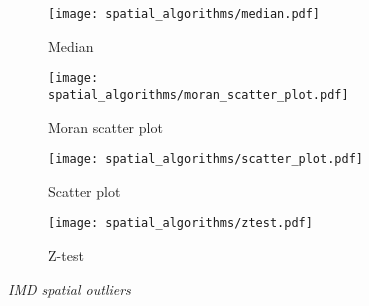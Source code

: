 \begin{figure}
\centering
	\begin{subfigure}[b]{0.45	\linewidth}
		\texttt{[image: spatial\_algorithms/median.pdf]}
		\caption{Median}
	\end{subfigure}	
	\begin{subfigure}[b]{0.45	\linewidth}
		\texttt{[image: spatial\_algorithms/moran\_scatter\_plot.pdf]}
		\caption{Moran scatter plot}
	\end{subfigure}
	\begin{subfigure}[b]{0.45	\linewidth}
		\texttt{[image: spatial\_algorithms/scatter\_plot.pdf]}
		\caption{Scatter plot}
	\end{subfigure}
	\begin{subfigure}[b]{0.45	\linewidth}
		\texttt{[image: spatial\_algorithms/ztest.pdf]}
		\caption{Z-test}
	\end{subfigure}	
\caption{\textit{IMD spatial outliers}}
\label{fig:IMD_spatial_outliers}
\end{figure}